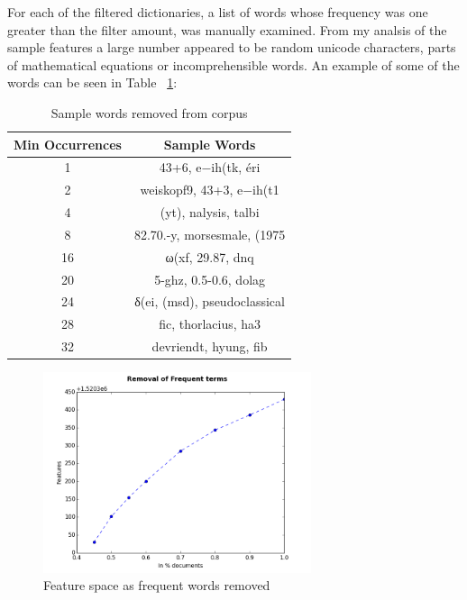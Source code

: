 For each of the filtered dictionaries, a list of words whose frequency was one greater than the filter amount, was manually examined.
From my analsis of the sample features a large number appeared to be random unicode characters, parts of mathematical equations or incomprehensible words.
An example of some of the words can be seen in Table ~\ref{table:infrequentWords}:

\begin{table}[h]
    \centering
    \begin{tabular}{|c c|}
         \hline
         Min Occurrences & Sample Words \\ [0.5ex]
         \hline\hline
         1 &  43+6, e−ih(tk, éri\\
         2 &  weiskopf9, 43+3, e−ih(t1\\
         4 &  (yt), nalysis, talbi\\
         8 &  82.70.-y, morsesmale, (1975\\
         16 &  ω(xf, 29.87, dnq\\
         20 &  5-ghz, 0.5-0.6, dolag\\
         24 &  δ(ei, (msd), pseudoclassical\\
         28 &  fic, thorlacius, ha3\\
         32 &  devriendt, hyung, fib\\ [1ex]
         \hline
    \end{tabular}
    \caption{Sample words removed from corpus}
    \label{table:infrequentWords}
\end{table}

\begin{figure}[h]
    \centering
        \includegraphics[width=0.7\textwidth]{Figures/CorpusFilterFrequent.png}
    \caption{Feature space as frequent words removed}
    \label{fig:FilterFrequent}
\end{figure}

